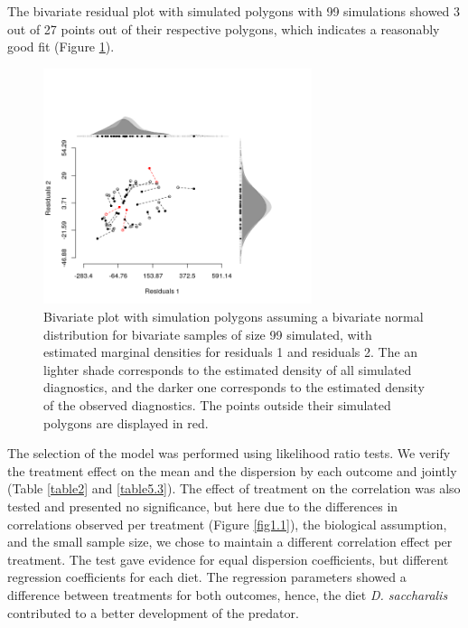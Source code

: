 \documentclass[useAMS,referee]{biom}
\begin{document}
The bivariate residual plot with simulated polygons with 99 simulations showed 3 out of 27 points out of their respective polygons, which indicates a reasonably good fit (Figure \ref{fig1.2}). 




\begin{figure}[h]
\centering
\includegraphics[width=0.7\textwidth]{pod4}
\caption{Bivariate plot with simulation polygons assuming a bivariate normal
distribution for bivariate samples of size 99 simulated, with estimated marginal densities for residuals 1 and residuals 2. The
an lighter shade corresponds to the estimated density of all simulated diagnostics,
and the darker one corresponds to the estimated density of the observed
diagnostics. The points outside their simulated polygons are
displayed in red.}
\label{fig1.2}
\end{figure}



The selection of the model was performed using likelihood ratio tests. We verify the treatment effect on the mean and the dispersion by each outcome and jointly (Table \ref{table2} and \ref{table5.3}). The effect of treatment on the correlation was also tested and presented no significance, but here due to the differences in correlations observed per treatment (Figure \ref{fig1.1}), the biological assumption, and the small sample size,  we chose to maintain a different correlation effect per treatment.
The test gave evidence for equal dispersion coefficients, but different regression coefficients for each diet.  The regression parameters showed a difference between treatments for both outcomes, hence, the diet \textit{D. saccharalis} contributed to a better development of the predator. 

\end{document}
